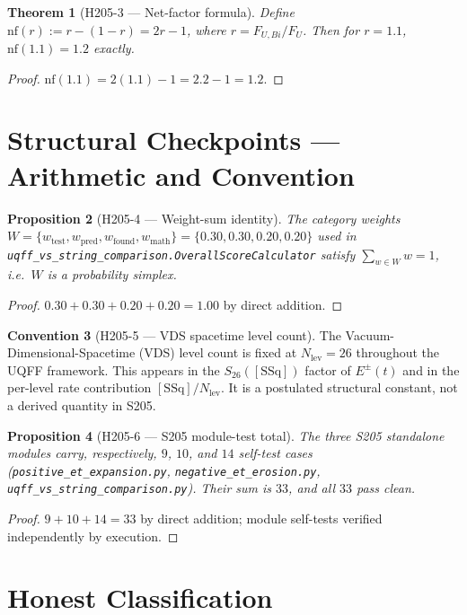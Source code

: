 \documentclass[11pt,letterpaper]{article}
\newtheorem{theorem}{Theorem}
\newtheorem{proposition}[theorem]{Proposition}
\theoremstyle{definition}
\newtheorem{convention}[theorem]{Convention}
\begin{document}
\begin{theorem}[H205-3 --- Net-factor formula]
\label{thm:H205-3}
Define $\text{nf}(r) := r - (1-r) = 2r - 1$, where $r = F_{U,Bi}/F_U$.
Then for $r = 1.1$, $\text{nf}(1.1) = 1.2$ exactly.
\end{theorem}
\begin{proof}
$\text{nf}(1.1) = 2(1.1) - 1 = 2.2 - 1 = 1.2$.
\end{proof}

\section{Structural Checkpoints --- Arithmetic and Convention}

\begin{proposition}[H205-4 --- Weight-sum identity]
\label{prop:H205-4}
The category weights
$W = \{w_{\text{test}}, w_{\text{pred}}, w_{\text{found}}, w_{\text{math}}\}
= \{0.30, 0.30, 0.20, 0.20\}$ used in
\texttt{uqff\_vs\_string\_comparison.OverallScoreCalculator} satisfy
$\sum_{w \in W} w = 1$, i.e.\ $W$ is a probability simplex.
\end{proposition}
\begin{proof}
$0.30 + 0.30 + 0.20 + 0.20 = 1.00$ by direct addition.
\end{proof}

\begin{convention}[H205-5 --- VDS spacetime level count]
\label{conv:H205-5}
The Vacuum-Dimensional-Spacetime (VDS) level count is fixed at
$N_{\mathrm{lev}} = 26$ throughout the UQFF framework. This appears in the
$S_{26}([\mathrm{SSq}])$ factor of $E^{\pm}(t)$ and in the per-level rate
contribution $[\mathrm{SSq}]/N_{\mathrm{lev}}$. It is a postulated structural
constant, not a derived quantity in S205.
\end{convention}

\begin{proposition}[H205-6 --- S205 module-test total]
\label{prop:H205-6}
The three S205 standalone modules carry, respectively, $9$, $10$, and $14$
self-test cases (\texttt{positive\_et\_expansion.py},
\texttt{negative\_et\_erosion.py}, \texttt{uqff\_vs\_string\_comparison.py}).
Their sum is $33$, and all $33$ pass clean.
\end{proposition}
\begin{proof}
$9 + 10 + 14 = 33$ by direct addition; module self-tests verified
independently by execution.
\end{proof}

\section{Honest Classification}
\end{document}
